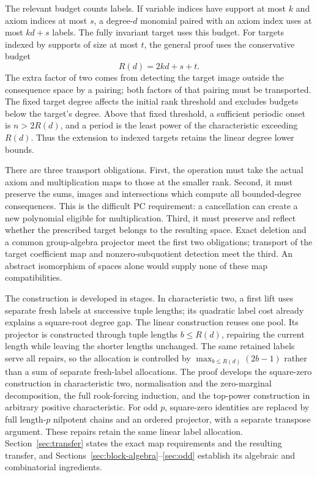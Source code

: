The relevant budget counts labels. If variable indices have support
at most $k$ and axiom indices at most $s$, a degree-$d$ monomial
paired with an axiom index uses at most $kd+s$ labels. The fully
invariant target uses this budget. For targets indexed by supports
of size at most $t$, the general proof uses the conservative budget
\[
                             R(d)=2kd+s+t.
\]
The extra factor of two comes from detecting the target image outside
the consequence space by a pairing; both factors of that pairing
must be transported. The fixed target degree affects the initial
rank threshold and excludes budgets below the target's degree.
Above that fixed threshold, a sufficient periodic onset is
$n>2R(d)$, and a period is the least power of the characteristic
exceeding $R(d)$. Thus the extension to indexed targets retains
the linear degree lower bounds.

There are three transport obligations. First, the operation must take
the actual axiom and multiplication maps to those at the smaller
rank. Second, it must preserve the sums, images and intersections
which compute all bounded-degree consequences. This is the difficult
PC requirement: a cancellation can create a new polynomial eligible
for multiplication. Third, it must preserve and reflect whether the
prescribed target belongs to the resulting space. Exact deletion and
a common group-algebra projector meet the first two obligations;
transport of the target coefficient map and nonzero-subquotient
detection meet the third. An abstract isomorphism of spaces alone
would supply none of these map compatibilities.

The construction is developed in stages. In characteristic two, a
first lift uses separate fresh labels at successive tuple lengths;
its quadratic label cost already explains a square-root degree gap.
The linear construction reuses one pool. Its projector is constructed
through tuple lengths $b\le R(d)$,
repairing the current length while leaving the shorter lengths
unchanged. The same retained labels serve all repairs, so the
allocation is controlled by $\max_{b\le R(d)}(2b-1)$ rather than
a sum of separate fresh-label allocations. The proof develops the
square-zero construction in characteristic two, normalisation and
the zero-marginal decomposition, the full rook-forcing induction,
and the top-power construction in arbitrary positive characteristic.
For odd $p$, square-zero identities are replaced by full length-$p$
nilpotent chains and an ordered projector, with a separate transpose
argument. These repairs retain the same linear label allocation.
Section~\ref{sec:transfer} states the exact map requirements and
the resulting transfer, and
Sections~\ref{sec:block-algebra}--\ref{sec:odd} establish its algebraic
and combinatorial ingredients.

